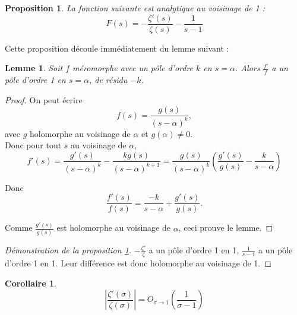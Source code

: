 \documentclass[french]{report}
\newtheorem{proposition}[theorem]{Proposition}
\newtheorem{corollary}[theorem]{Corollaire}
\newtheorem{lemma}[theorem]{Lemme}
\begin{document}
\begin{proposition}\label{prop:zeta-sur-zeta-prime-1-sur-holomorphe}
  La fonction suivante est analytique au voisinage de 1 :
  \[ F(s) = - \frac{\zeta'(s)}{\zeta(s)} - \frac{1}{s-1} \]
\end{proposition}

Cette proposition découle immédiatement du lemme suivant :

\begin{lemma}
  Soit $f$ méromorphe avec un pôle d'ordre $k$ en $s=\alpha$. Alors $\frac{f'}{f}$ a un pôle d'ordre 1 en $s=\alpha$, de résidu $-k$.
\end{lemma}

\begin{proof}
  On peut écrire
  \[ f(s) = \frac{g(s)}{(s-\alpha)^k},\]
  avec $g$ holomorphe au voisinage de $\alpha$ et $g(\alpha)\neq0$.
  \\

  Donc pour tout $s$ au voisinage de $\alpha$,
  \[
    f'(s)
    = \frac{g'(s)}{(s-\alpha)^k}-\frac{kg(s)}{(s-\alpha)^{k+1}}
    = \frac{g(s)}{(s-\alpha)^k}\left(\frac{g'(s)}{g(s)}-\frac{k}{s-\alpha}\right)
  \]

  Donc
  \[
    \frac{f'(s)}{f(s)} = \frac{-k}{s-\alpha}+\frac{g'(s)}{g(s)}.
  \]

  Comme $\frac{g'(s)}{g(s)}$ est holomorphe au voisinage de $\alpha$, ceci prouve le lemme.
\end{proof}

\begin{proof}[Démonstration de la proposition \ref{prop:zeta-sur-zeta-prime-1-sur-holomorphe}]
 $-\frac{\zeta'}{\zeta}$ a un pôle d'ordre 1 en 1, $\frac{1}{s-1}$ a un pôle d'ordre 1 en 1. Leur différence est donc holomorphe au voisinage de 1.
\end{proof}

\begin{corollary}\label{cor:zeta-sur-zeta-prime-o}
  \[ \left|\frac{\zeta'(\sigma)}{\zeta(\sigma)}\right| = O_{\sigma\to1}\left(\frac{1}{\sigma-1}\right) \]
\end{corollary}

\end{document}
